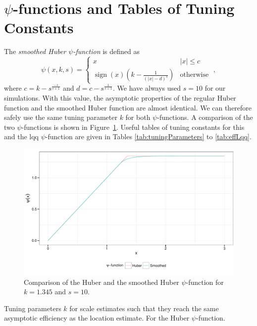 \documentclass[11pt, a4paper]{article}
\newcommand{\abs}[1]    {\left| #1 \right|}
\DeclareMathOperator{\sign}{sign}
\theoremstyle{note}
\begin{document}
\section{$\psi$-functions and Tables of Tuning Constants}
\label{sec:tc}
The \emph{smoothed Huber $\psi$-function} is defined as
\begin{equation}
  \psi(x, k, s) = \left\{
    \begin{array}{ll}
      x & \abs{x} \leq c \\
      \sign(x)\left(k - \frac{1}{(\abs{x}-d)^{s}}\right) &
      \mbox{otherwise}
    \end{array}
  \right.\;,
\end{equation}
where $c = k - s^{\frac{-s}{s+1}}$ and $d = c - s^{\frac{1}{s+1}}$. We have
always used $s = 10$ for our simulations. With this value, the asymptotic
properties of the regular Huber function and the smoothed Huber function
are almost identical. We can therefore safely use the same tuning parameter
$k$ for both $\psi$-functions. A comparison of the two $\psi$-functions is
shown in Figure~\ref{fig:smoothedHuber}. Useful tables of tuning constants
for this and the lqq $\psi$-function are given in Tables
\ref{tab:tuningParameters} to \ref{tab:effLqq}.


\vspace{5ex}

\begin{figure}[htbp!]
  \centering
  \includegraphics{figs/fig-ex-smoothedHuber}
  \caption{Comparison of the Huber and the smoothed Huber $\psi$-function
    for $k = 1.345$ and $s = 10$.}
  \label{fig:smoothedHuber}
\end{figure}


\clearpage
\begin{table}[htbp]
  \centering
  
  \caption{Tuning parameters $k$ for scale estimates such that they reach the
    same asymptotic efficiency as the location estimate. For the Huber
    $\psi$-function.}
  \label{tab:tuningParameters}
\end{table}





\clearpage
{}


\end{document}
